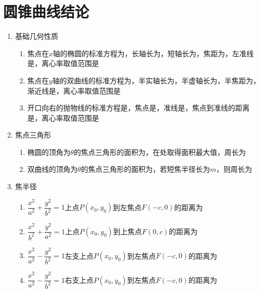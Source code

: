\section*{圆锥曲线结论}

\begin{enumerate}
    \item 基础几何性质
    \begin{enumerate}
        \item 焦点在$x$轴的椭圆的标准方程为，长轴长为，短轴长为，焦距为，左准线是，离心率取值范围是
        \item 焦点在$y$轴的双曲线的标准方程为，半实轴长为，半虚轴长为，半焦距为，渐近线是，离心率取值范围是
        \item 开口向右的抛物线的标准方程是，焦点是，准线是，焦点到准线的距离是，离心率取值范围是
    \end{enumerate}
    \item 焦点三角形
    \begin{enumerate}
        \item 椭圆的顶角为$\theta$的焦点三角形的面积为，在处取得面积最大值，周长为
        \item 双曲线的顶角为$\theta$的焦点三角形的面积为，若短焦半径长为$m$，则周长为
    \end{enumerate}
    \item 焦半径
    \begin{enumerate}
        \item $\dfrac{x^2}{a^2}+\dfrac{y^2}{b^2} = 1$上点$P(x_0, y_0)$到左焦点$F(-c, 0)$的距离为
        \item $\dfrac{x^2}{b^2}+\dfrac{y^2}{a^2} = 1$上点$P(x_0, y_0)$到上焦点$F(0, c)$的距离为
        \item $\dfrac{x^2}{a^2}-\dfrac{y^2}{b^2} = 1$左支上点$P(x_0, y_0)$到左焦点$F(-c, 0)$的距离为
        \item $\dfrac{x^2}{a^2}-\dfrac{y^2}{b^2} = 1$右支上点$P(x_0, y_0)$到左焦点$F(-c, 0)$的距离为

\end{enumerate}
\end{enumerate}
